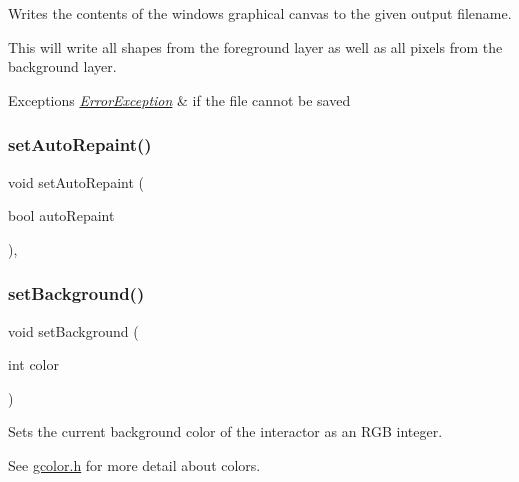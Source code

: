Writes the contents of the window\textquotesingle{}s graphical canvas to the given output filename. 

This will write all shapes from the foreground layer as well as all pixels from the background layer. 
\begin{DoxyExceptions}{Exceptions}
{\em \mbox{\hyperlink{classErrorException}{Error\+Exception}}} & if the file cannot be saved \\
\hline
\end{DoxyExceptions}
\mbox{\label{classGForwardDrawingSurface_ade731c276cd0bcd37639280d06571333}} 
\subsubsection{\texorpdfstring{set\+Auto\+Repaint()}{setAutoRepaint()}}
{\footnotesize\ttfamily void set\+Auto\+Repaint (\begin{DoxyParamCaption}\item[{bool}]{auto\+Repaint }\end{DoxyParamCaption})\hspace{0.3cm}{\ttfamily [virtual]}, {\ttfamily [inherited]}}

\mbox{\label{classGWindow_a427fefbbc34e39e5df27a807da488e0d}} 
\subsubsection{\texorpdfstring{set\+Background()}{setBackground()}\hspace{0.1cm}{\footnotesize\ttfamily [1/2]}}
{\footnotesize\ttfamily void set\+Background (\begin{DoxyParamCaption}\item[{int}]{color }\end{DoxyParamCaption})\hspace{0.3cm}{\ttfamily [virtual]}}



Sets the current background color of the interactor as an R\+GB integer. 

See \mbox{\hyperlink{gcolor_8h_source}{gcolor.\+h}} for more detail about colors. 

